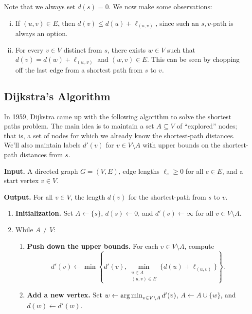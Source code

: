 Note that we always set $d(s) = 0$. We now make some observations: 
\begin{enumerate}[(i)]
    \item If $(u, v) \in E$, then $d(v) \leq d(u) + \ell_{(u,v)}$, since 
    such an $s, v$-path is always an option.
    \item For every $v \in V$ distinct from $s$, there exists $w \in V$ 
    such that $d(v) = d(w) + \ell_{(w, v)}$ and $(w, v) \in E$. This can 
    be seen by chopping off the last edge from a shortest path from $s$ to $v$.
\end{enumerate}

\subsection{Dijkstra's Algorithm}\label{subsec:1.3}
In 1959, Dijkstra came up with the following algorithm to solve the 
shortest paths problem. The main idea is to maintain a set $A \subseteq V$ 
of ``explored'' nodes; that is, a set of nodes for which we already know the 
shortest-path distances. We'll also maintain labels $d'(v)$ for $v \in 
V \setminus A$ with upper bounds on the shortest-path distances from $s$. 

\begin{mdframed}[
    linewidth=1pt,
    linecolor=black,
    bottomline=false,topline=false,rightline=false,
    innerrightmargin=0pt,innertopmargin=0pt,innerbottommargin=0pt,
    innerleftmargin=1em,%
    skipabove=0.75\baselineskip
]
{\bf Input.} A directed graph $G = (V, E)$, edge lengths $\ell_e \geq 0$ for 
all $e \in E$, and a start vertex $v \in V$. 

{\bf Output.} For all $v \in V$, the length $d(v)$ for the shortest-path from 
$s$ to $v$.
\begin{enumerate}[leftmargin=1.75cm, label={Step \arabic*.}]
    \item {\bf Initialization.} Set $A \gets \{s\}$, $d(s) \gets 0$, and $d'(v) \gets \infty$ 
    for all $v \in V \setminus A$.

    \item While $A \neq V$:
    \begin{enumerate}[label={Step 2.\arabic*.}]
        \item {\bf Push down the upper bounds.} For each $v \in V \setminus A$, compute 
        \[ d'(v) \gets \min\left\{ d'(v), \min_{\substack{u\in A \\ (u, v) \in E}} 
        \{ d(u) + \ell_{(u, v)} \} \right\}. \] 
        \item {\bf Add a new vertex.} Set $w \gets \operatorname*{arg\,min}_{v \in V \setminus A} d'(v)$, 
        $A \gets A \cup \{w\}$, and $d(w) \gets d'(w)$. 
    \end{enumerate}
\end{enumerate}
\end{mdframed}\vspace{-0.25cm}

